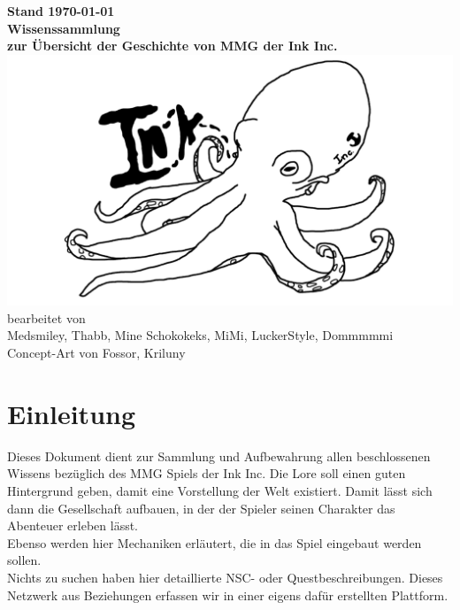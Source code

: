 \documentclass[a4paper,12pt,%
headsepline,%
numbers=noenddot,%
]{scrreprt}
\begin{document}
\begin{titlepage}
	\centering
	\vfill
	\Large{\textbf{Stand {\today}}} \\ \bigskip
	\vfill
	\textsf{\textbf{\Huge{Wissenssammlung}}} \\ \bigskip
	\Large{\textbf{zur Übersicht der Geschichte von MMG der Ink Inc.}} \\ \bigskip
	\vfill
	\includegraphics[width=\linewidth]{Abbildungen/logo.png} \\ \bigskip
	\vfill
	\large
	bearbeitet von\\
	Medsmiley, Thabb, Mine Schokokeks, MiMi, LuckerStyle, Dommmmmi \\ \bigskip
	Concept-Art von Fossor, Kriluny
\end{titlepage}

\tableofcontents
\listoffigures



\chapter*{Einleitung}
Dieses Dokument dient zur Sammlung und Aufbewahrung allen beschlossenen Wissens bezüglich des MMG Spiels der Ink Inc. Die Lore soll einen guten Hintergrund geben, damit eine Vorstellung der Welt existiert. Damit lässt sich dann die Gesellschaft aufbauen, in der der Spieler seinen Charakter das Abenteuer erleben lässt. \\
Ebenso werden hier Mechaniken erläutert, die in das Spiel eingebaut werden sollen. \\

Nichts zu suchen haben hier detaillierte NSC- oder Questbeschreibungen. Dieses Netzwerk aus Beziehungen erfassen wir in einer eigens dafür erstellten Plattform. 
\end{document}
